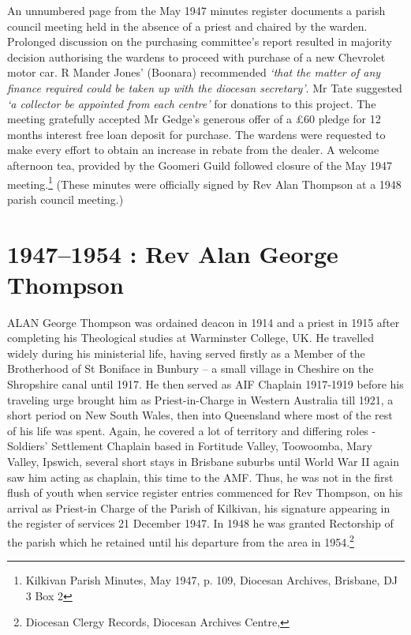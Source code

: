 An unnumbered page from the May 1947 minutes register documents a parish council meeting held in the absence of a priest and chaired by the warden. Prolonged discussion on the purchasing committee's report resulted in majority decision authorising the wardens to proceed with purchase of a new Chevrolet motor car. R Mander Jones' (Boonara) recommended \emph{`that the matter of any finance required could be taken up with the diocesan secretary'}. Mr Tate suggested \emph{`a collector be appointed from each centre'} for donations to this project. The meeting gratefully accepted Mr Gedge's generous offer of a \pounds60 pledge for 12 months interest free loan deposit for purchase. The wardens were requested to make every effort to obtain an increase in rebate from the dealer. A welcome afternoon tea, provided by the Goomeri Guild followed closure of the May 1947 meeting.\footnote{Kilkivan Parish Minutes, May 1947, p. 109, Diocesan Archives, Brisbane, DJ 3 Box 2} (These minutes were officially signed by Rev Alan Thompson at a 1948 parish council meeting.)


\balance


\printendnotes[custom]
\setcounter{endnote}{0}
\chapter{1947--1954 : Rev Alan George Thompson}
\nobalance


\lettrine[lines=3]{A}{LAN}
 George Thompson was ordained deacon in 1914 and a priest in 1915 after completing his Theological studies at Warminster College, UK. He travelled widely during his ministerial life, having served firstly as a Member of the Brotherhood of St Boniface in Bunbury -- a small village in Cheshire on the Shropshire canal until 1917. He then served as AIF Chaplain 1917-1919 before his traveling urge brought him as Priest-in-Charge in Western Australia till 1921, a short period on New South Wales, then into Queensland where most of the rest of his life was spent. Again, he covered a lot of territory and differing roles - Soldiers' Settlement Chaplain based in Fortitude Valley, Toowoomba, Mary Valley, Ipswich, several short stays in Brisbane suburbs until World War II again saw him acting as chaplain, this time to the AMF. Thus, he was not in the first flush of youth when service register entries commenced for Rev Thompson, on his arrival as Priest-in Charge of the Parish of Kilkivan, his signature appearing in the register of services 21 December 1947. In 1948 he was granted Rectorship of the parish which he retained until his departure from the area in 1954.\footnote{Diocesan Clergy Records, Diocesan Archives Centre,}

